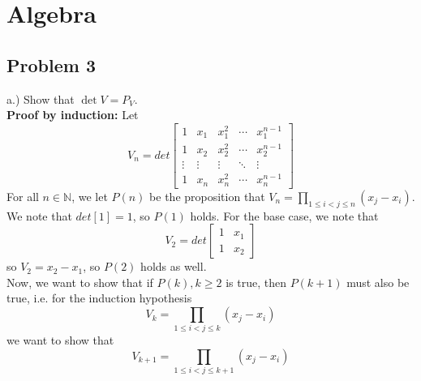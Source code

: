 \documentclass[12pt]{article}
\begin{document}
\section{Algebra}

	\subsection*{Problem 3}

a.) Show that $\det V = P_V$. \\ 

\textbf{Proof by induction:} Let 
$$V_n = det \begin{bmatrix} 1 & x_1 & x_1^2 & \cdots & x_1^{n-1} \\ 1 &x_2 & x_2^2 & \cdots & x_2^{n-1} \\ \vdots & \vdots & \vdots & \ddots & \vdots \\ 1 &x_n & x_n^2 & \cdots & x_n^{n-1} \end{bmatrix}$$
For all $n \in \mathbb{N}$, we let $P(n)$ be the proposition that $V_n = \prod_{1 \leq i < j \leq n} (x_j - x_i)$.
We note that $det [1] = 1$, so $P(1)$ holds. For the base case, we note that 
$$V_2 = det \begin{bmatrix} 1 & x_1 \\ 1 & x_2 \end{bmatrix}$$
so $V_2 = x_2 - x_1$, so $P(2)$ holds as well. \\

Now, we want to show that if $P(k), k \geq 2$ is true, then $P(k+1)$ must also be true, i.e. for the induction hypothesis
$$V_k = \prod_{1 \leq i < j \leq k} (x_j - x_i)$$
we want to show that
$$V_{k+1} = \prod_{1 \leq i < j \leq k+1} (x_j - x_i)$$\\
\end{document}
